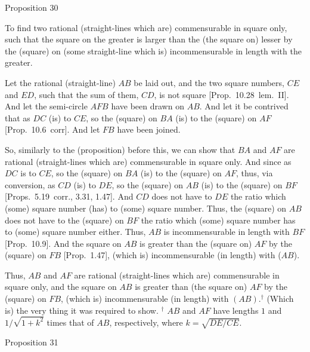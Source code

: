 
\begin{center}
{\large Proposition 30}
\end{center}

To find two rational (straight-lines which are)
commensurable in square only, such that the square on the greater
is larger than the (the square on)  lesser by the (square) on (some
straight-line which is) incommensurable in length with the greater.

\epsfysize=1.7in
\centerline{}

Let the rational (straight-line) $AB$ be laid out, and the two square
numbers, $CE$ and $ED$, such that the sum of them, $CD$,
is not square [Prop.~10.28~lem.~II].
And let the semi-circle $AFB$ have been drawn on $AB$. And let it
be contrived that as $DC$ (is) to $CE$, so the (square) on
$BA$ (is) to the (square) on $AF$ [Prop.~10.6~corr].
And let $FB$ have been joined.

So, similarly to the (proposition) before this, we can show that $BA$ and
$AF$ are rational (straight-lines which are) commensurable in square only.
And since as $DC$ is to $CE$, so the (square) on $BA$ (is) to the (square)
on $AF$, thus, via conversion, as $CD$ (is) to $DE$, so the (square) on
$AB$ (is) to the (square) on $BF$ [Props.~5.19~corr., 3.31, 1.47]. And
$CD$ does not have to $DE$ the ratio which (some) square number
(has) to (some) square number. Thus, the (square) on $AB$
does not have to the (square) on $BF$ the ratio which (some)
square number has to (some) square number either. Thus, $AB$ is
incommensurable in length with $BF$ [Prop.~10.9].
And the square on $AB$ is greater than the (square on) $AF$ by the
(square) on $FB$  [Prop.~1.47], (which is) incommensurable (in length) with ($AB$).

Thus, $AB$ and $AF$ are rational (straight-lines which are) commensurable
in square only, and the square on $AB$ is greater than (the square on) $AF$
by the (square) on $FB$, (which is) incommensurable (in length) with
 $(AB)$.$^\dag$ (Which is) the very thing it was required to show.
{\footnotesize\noindent$^\dag$ $AB$ and $AF$ have lengths $1$ and $1/\sqrt{1+k^2}$
times that of $AB$, respectively, where $k=\sqrt{DE/CE}$.}


\begin{center}
{\large Proposition 31}
\end{center}

